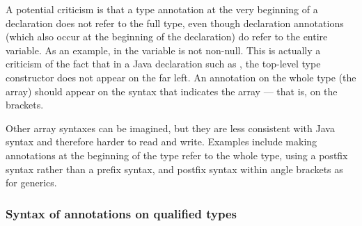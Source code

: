 \documentclass[10pt]{article}
\newcommand{\preverbnegspace}{\vspace{-5pt}}
\begin{document}


A potential criticism is that a type annotation at the very beginning of a
declaration does not refer to the full type, even though declaration
annotations (which also occur at the beginning of
the declaration) do refer to the entire variable.  As an example, in
 the variable  is not non-null.
This is actually a criticism of the fact that in a Java declaration such as
, the top-level type constructor does not appear on
the far left.
An annotation on the whole type (the array) should
appear on the syntax that indicates the array --- that is, on the brackets.


Other array syntaxes can be imagined, but they are less consistent with
Java syntax and therefore harder to read and write.
Examples include
making annotations at the beginning of the type refer to the whole type,
using a postfix syntax rather than a prefix syntax, and postfix syntax
within angle brackets as for generics.






\subsubsection{Syntax of annotations on qualified types\label{qualified-type-syntax}}
\end{document}

